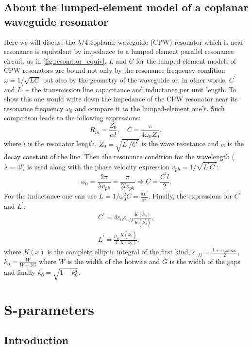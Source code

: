 \documentclass[12pt]{report}
\numberwithin{equation}{section}
\begin{document}
\subsection{About the lumped-element model of a coplanar waveguide resonator}
Here we will discuss the $\lambda/4$ coplanar waveguide (CPW) resonator which is near resonance is equivalent by impedance to a lumped element parallel resonance circuit, as in \autoref{fig:resonator_equiv}. $L$ and $C$ for the lumped-element models of CPW resonators are bound not only by the resonance frequency condition $\omega = 1/\sqrt{LC}$ but also by the geometry of the waveguide or, in other words, $C^\prime$ and $L^\prime$ -- the transmission line capacitance and inductance per unit length. To show this one would write down the impedance of the CPW resonator near its resonance frequency $\omega_0$ and compare it to the lumped-element one's\cite{pozar2012}. Such comparison leads to the following expressions:
\[
R_{in} = \frac{Z_0}{\alpha l}, \quad C = \frac{\pi}{4\omega_0 Z_0},
\]
where $l$ is the resonator length, $Z_0 = \sqrt{L^\prime/C^\prime}$ is the wave resistance and $\alpha$ is the decay constant of the line. Then the resonance condition for the wavelength ($\lambda = 4 l$) is used along with the phase velocity expression $v_{ph} = 1/\sqrt{L^\prime C^\prime}$:
\[
\omega_0 = \frac{2\pi}{\lambda v_{ph}} =  \frac{\pi}{2 l v_{ph}} \Rightarrow  C = \frac{C^\prime l}{2}.
\]
For the inductance one can use $L = 1/\omega_0^2 C = \frac{8 L^\prime}{\pi^2}$. Finally, the expressions for $C^\prime$ and $L^\prime$:
\begin{gather*}
C^\prime = 4\varepsilon_0\varepsilon_{eff} \frac{K(k_0)}{K(k_0^\prime)},\\
L^\prime = \frac{\mu_0}{4} \frac{K(k_0^\prime)}{K(k_0)},
\end{gather*}
where $K(x)$ is the complete elliptic integral of the first kind, $\varepsilon_{eff} = \frac{1+\varepsilon_{substrate}}{2}$, $k_0 = \frac{W}{W+2G}$ where $W$ is the width of the hotwire and $G$ is the width of the gaps and finally $k_0^\prime = \sqrt{1-k_0^2}$.

\section{S-parameters}

\subsection{Introduction}
\end{document}

